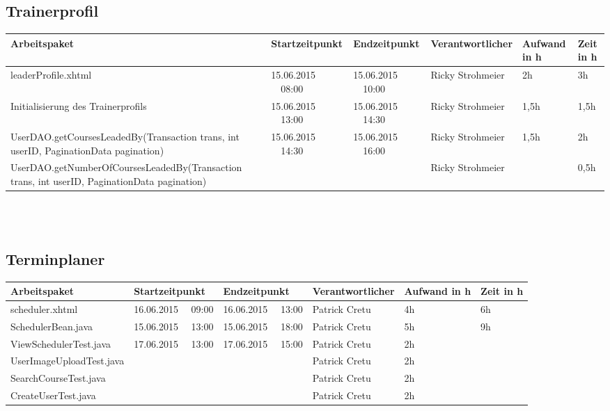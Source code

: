 \begin{landscape}
	\subsection{Trainerprofil}
	\begin{tabular}{|p{10.3cm}|p{3.2cm}|p{3.2cm}|p{3.5cm}|p{1.7cm}|p{1.5cm}|}
		\hline  \textbf{Arbeitspaket} & \textbf{Startzeitpunkt} & \textbf{Endzeitpunkt} & \textbf{Verantwortlicher}  & \textbf{Aufwand in h} & \textbf{Zeit in h}\\
		\hline   leaderProfile.xhtml                      & 15.06.2015 \ \ 08:00        & 15.06.2015 \ \ 10:00        & Ricky Strohmeier &  2h                 &   3h\\
		\hline   Initialisierung des Trainerprofils& 15.06.2015 \ \ 13:00        & 15.06.2015 \ \ 14:30        & Ricky Strohmeier &  1,5h       & 1,5h \\
		\hline   UserDAO.getCoursesLeadedBy(Transaction trans, int userID, PaginationData pagination)  & 15.06.2015 \ \ 14:30        & 15.06.2015 \ \ 16:00   &  Ricky  Strohmeier &  1,5h  & 2h\\
		\hline   UserDAO.getNumberOfCoursesLeadedBy(Transaction trans, int userID, PaginationData pagination)  &      &    &  Ricky  Strohmeier &   & 0,5h\\
		\hline 
	\end{tabular} \ \\
	\ \\
	
	\subsection{Terminplaner}
	\begin{tabular}{|p{10.3cm}|p{3.2cm}|p{3.2cm}|p{3.5cm}|p{1.7cm}|p{1.5cm}|}
		\hline  \textbf{Arbeitspaket} & \textbf{Startzeitpunkt} & \textbf{Endzeitpunkt} & \textbf{Verantwortlicher}  & \textbf{Aufwand in h} & \textbf{Zeit in h}\\
		\hline   scheduler.xhtml                                 & 16.06.2015 \ \ 09:00        & 16.06.2015 \ \ 13:00       & Patrick Cretu  &  4h  &    6h\\ 
		\hline   SchedulerBean.java                              & 15.06.2015 \ \ 13:00        & 15.06.2015 \ \ 18:00       & Patrick Cretu  &  5h  &    9h\\ 
		\hline   ViewSchedulerTest.java                          & 17.06.2015 \ \ 13:00 & 17.06.2015 \ \ 15:00              & Patrick Cretu  &  2h  &    \\
		\hline   UserImageUploadTest.java                        &                      &                                   & Patrick Cretu  &  2h  &    \\
		\hline   SearchCourseTest.java                           &                      &                                   & Patrick Cretu  &  2h  &    \\
		\hline   CreateUserTest.java                             &                      &                                   & Patrick Cretu  &  2h  &    \\
		\hline 
	\end{tabular} \ \\
	\ \\
	

\end{landscape}

